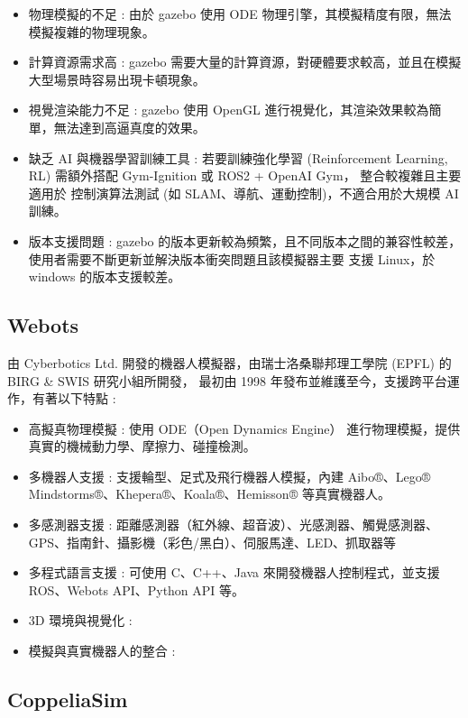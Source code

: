 \begin{itemize}
      \item 物理模擬的不足 :
            由於 gazebo 使用 ODE 物理引擎，其模擬精度有限，無法模擬複雜的物理現象。
      \item 計算資源需求高 :
            gazebo 需要大量的計算資源，對硬體要求較高，並且在模擬大型場景時容易出現卡頓現象。
      \item 視覺渲染能力不足 :
            gazebo 使用 OpenGL 進行視覺化，其渲染效果較為簡單，無法達到高逼真度的效果。
      \item 缺乏 AI 與機器學習訓練工具 :
            若要訓練強化學習 (Reinforcement Learning, RL) 需額外搭配 Gym-Ignition 或 ROS2 + OpenAI Gym，
            整合較複雜且主要適用於 控制演算法測試 (如 SLAM、導航、運動控制)，不適合用於大規模 AI 訓練。
      \item 版本支援問題 :
            gazebo 的版本更新較為頻繁，且不同版本之間的兼容性較差，使用者需要不斷更新並解決版本衝突問題且該模擬器主要
            支援 Linux，於 windows 的版本支援較差。
\end{itemize}
\subsection{Webots}
由 Cyberbotics Ltd.\cite{Michel2004Webots} 開發的機器人模擬器，由瑞士洛桑聯邦理工學院 (EPFL) 的 BIRG \& SWIS 研究小組所開發，
最初由 1998 年發布並維護至今，支援跨平台運作，有著以下特點 :
\begin{itemize}
      \item 高擬真物理模擬 :
            使用 ODE（Open Dynamics Engine） 進行物理模擬，提供真實的機械動力學、摩擦力、碰撞檢測。
      \item 多機器人支援 :
            支援輪型、足式及飛行機器人模擬，內建 Aibo®、Lego® Mindstorms®、Khepera®、Koala®、Hemisson® 等真實機器人。
      \item 多感測器支援 : 距離感測器（紅外線、超音波）、光感測器、觸覺感測器、GPS、指南針、攝影機（彩色/黑白）、伺服馬達、LED、抓取器等
      \item 多程式語言支援 : 可使用 C、C++、Java 來開發機器人控制程式，並支援 ROS、Webots API、Python API 等。
      \item 3D 環境與視覺化 :
      \item 模擬與真實機器人的整合 :
\end{itemize}
\subsection{CoppeliaSim}
